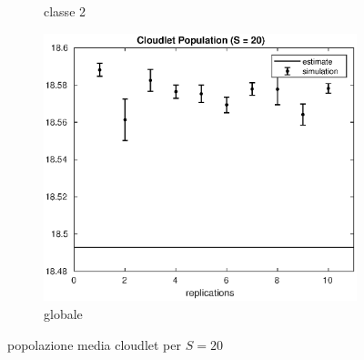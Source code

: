 \begin{figure}[!h]
\begin{subfigure}[t]{0.49\textwidth}
\caption{classe 2}
\label{20_n2clet}
\end{subfigure}
%
\begin{subfigure}[t]{0.5\textwidth}
\includegraphics[width=\textwidth]{figures/simul/20_500K_nclet}
\caption{globale}
\label{20_nclet}
\end{subfigure}
%
\caption{popolazione media cloudlet per $S = 20$}
\end{figure}
%

